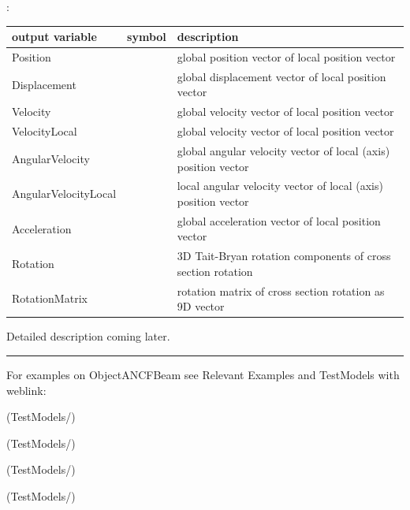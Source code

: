 :
\begin{center}
\footnotesize
\begin{longtable}{| p{5cm} | p{5cm} | p{6cm} |} 
\hline
\bf output variable & \bf symbol & \bf description \\ \hline
Position &  & global position vector of local position vector\\ \hline
Displacement &  & global displacement vector of local position vector\\ \hline
Velocity &  & global velocity vector of local position vector\\ \hline
VelocityLocal &  & global velocity vector of local position vector\\ \hline
AngularVelocity &  & global angular velocity vector of local (axis) position vector\\ \hline
AngularVelocityLocal &  & local angular velocity vector of local (axis) position vector\\ \hline
Acceleration &  & global acceleration vector of local position vector\\ \hline
Rotation &  & 3D Tait-Bryan rotation components of cross section rotation\\ \hline
RotationMatrix &  & rotation matrix of cross section rotation as 9D vector\\ \hline
\end{longtable}
\end{center}
 \noindent
    Detailed description coming later.
\vspace{6pt}\par\noindent\rule{\textwidth}{0.4pt}
%
\noindent For examples on ObjectANCFBeam see Relevant Examples and TestModels with weblink:
\bi
\item {} (TestModels/)
\item {} (TestModels/)
\item {} (TestModels/)
\item {} (TestModels/)

